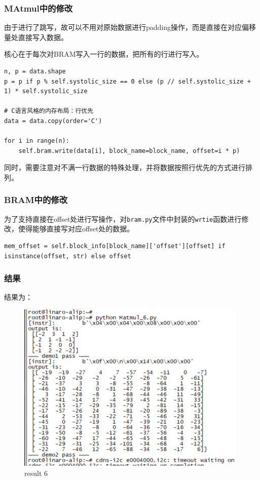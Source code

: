 \documentclass[12pt,a4paper]{article}
\begin{document}
\subsubsection{MAtmul中的修改}

由于进行了跳写，故可以不用对原始数据进行padding操作，而是直接在对应偏移量处直接写入数据。

核心在于每次对BRAM写入一行的数据，把所有的行进行写入。

\begin{lstlisting}
n, p = data.shape
p = p if p % self.systolic_size == 0 else (p // self.systolic_size + 1) * self.systolic_size

# C语言风格的内存布局：行优先
data = data.copy(order='C')

for i in range(n):
    self.bram.write(data[i], block_name=block_name, offset=i * p)
\end{lstlisting}

同时，需要注意对不满一行数据的特殊处理，并将数据按照行优先的方式进行排列。

\subsubsection{BRAM中的修改}

为了支持直接在offset处进行写操作，对\texttt{bram.py}文件中封装的\texttt{wrtie}函数进行修改，使得能够直接写对应offset处的数据。

\begin{lstlisting}
mem_offset = self.block_info[block_name]['offset'][offset] if isinstance(offset, str) else offset
\end{lstlisting}

\subsubsection{结果}

结果为：

\begin{figure}[htbp]
    \centering
    \includegraphics[width=0.6\linewidth]{img/result_6.png}
    \caption{result 6}
\end{figure}
\end{document}
